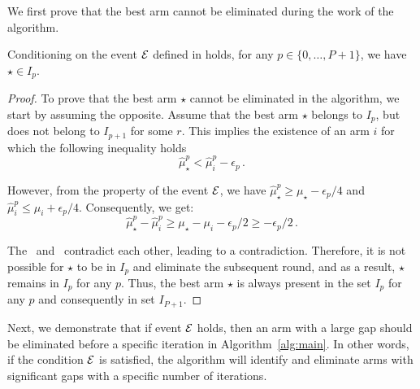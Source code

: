 We first prove that the best arm cannot be eliminated during the work of the algorithm. 
\begin{lemma}\label{lem:best}
    Conditioning on the event \(\mathcal{E}\) defined in  holds, for any \(p \in \{0, \dotsc, P + 1\}\), we have \(\star \in I_p\). 
\end{lemma}

\begin{proof}
    To prove that the best arm \(\star\) cannot be eliminated in the algorithm, we start by assuming the opposite. Assume that the best arm \(\star\) belongs to \(I_p\), but does not belong to \(I_{p + 1}\) for some \(r\). This implies the existence of an arm \(i\) for which the following inequality holds 
    \begin{equation}\label{eq:upper-bound}
        \hat{\mu}^{p}_\star < \hat{\mu}^{p}_i - \epsilon_p \,.
    \end{equation}

    However, from the property of the event \(\mathcal{E}\), we have \(\hat{\mu}^{p}_\star \ge \mu_\star - \epsilon_p / 4 \) and \(\hat{\mu}^p_i \le \mu_i + \epsilon_p / 4\).
    Consequently, we get: 
    \begin{equation}\label{eq:lower-bound}
        \hat{\mu}^p_\star - \hat{\mu}^p_i \ge \mu_\star - \mu_i -\epsilon_p / 2 \ge -\epsilon_p / 2\,.
    \end{equation}

    The~ and~ contradict each other, leading to a contradiction. Therefore, it is not possible for \(\star\) to be in \(I_p\) and eliminate the subsequent round, and as a result, \(\star\) remains in \(I_p\) for any \(p\). Thus, the best arm \(\star\) is always present in the set \(I_p\) for any \(p\) and consequently in set \(I_{P + 1}\). 
\end{proof}


Next, we demonstrate that if event \(\mathcal{E}\) holds, then an arm with a large gap should be eliminated before a specific iteration in Algorithm~\ref{alg:main}. In other words, if the condition \(\mathcal{E}\) is satisfied, the algorithm will identify and eliminate arms with significant gaps with a specific number of iterations. 

